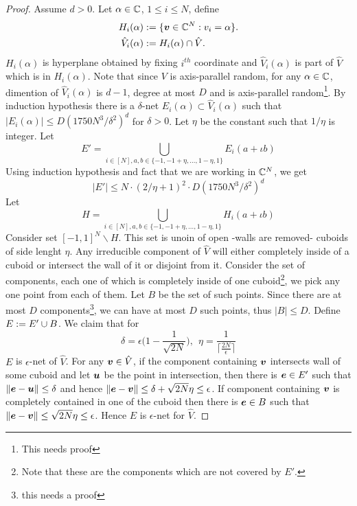 {\begin{proof}
Assume $d>0$. Let $\alpha \in \mathbb{C}$, $1\le i \le N$, define 
\begin{align*}
H_i(\alpha) &:= \{ \bm v \in \mathbb{C}^N : v_i = \alpha \}.\\
\hat V_i(\alpha) &:= H_i(\alpha) \cap \hat V.
\end{align*}
$H_i(\alpha)$ is hyperplane obtained by fixing $i^{th}$ coordinate and $\hat V_i(\alpha)$ is part of $\hat V$ which is in $H_i(\alpha)$. Note that since $V$ is axis-parallel random, for any $\alpha \in \mathbb{C}$, dimention of $\hat V_i(\alpha)$ is $d-1$, degree at most $D$ and is axis-parallel random\footnote{This needs proof}. By induction hypothesis there is a $\delta$-net $E_i(\alpha) \subset \hat V_i(\alpha)$ such that $|E_i(\alpha)|\le D(1750N^3/\delta^2)^d$ for $\delta>0$. Let $\eta$ be the constant such that $1/\eta$ is integer. Let
$$E'=\bigcup_{i\in [N],a,b \in \{-1,-1+\eta,...,1-\eta,1\}}E_i(a+\iota b)$$
Using induction hypothesis and fact that we are working in $\mathbb{C}^N$, we get
$$
|E'| \le N\cdot(2/\eta+1)^2\cdot D(1750N^3/\delta^2)^{d}
$$
Let
$$H=\bigcup_{i\in [N],a,b \in \{-1,-1+\eta,...,1-\eta,1\}}H_i(a+\iota b)$$
Consider set $[-1,1]^N\backslash H$. This set is unoin of open -walls are removed- cuboids of side lenght $\eta$. Any irreducible component of $\hat V$ will either completely inside of a cuboid or intersect the wall of it or disjoint from it. Consider the set of components, each one of which is completely inside of one cuboid\footnote{Note that these are the components which are not covered by $E'$.}, we pick any one point from each of them. Let $B$ be the set of such points. Since there are at most $D$ components\footnote{this needs a proof}, we can have at most $D$ such points, thus $|B| \le D$. Define $E:= E'\cup B$. We claim that for 
$$
\delta=\epsilon\Big(1-\frac{1}{\sqrt{2N}}\Big),\ \ \eta=\frac{1}{\lceil\frac{2N}{\epsilon}\rceil}
$$ 
$E$ is $\epsilon$-net of $\hat V$. For any $\bm v \in \hat V$, if the component containing $\bm v$ intersects wall of some cuboid and let $\bm u$ be the point in intersection, then there is $\bm e \in E'$ such that $\|\bm e-\bm u\|\le \delta$ and hence $\|\bm e-\bm v\| \le \delta + \sqrt{2N}\eta\le \epsilon$. If component containing $\bm v$ is completely contained in one of the cuboid then there is $\bm e \in B$ such that $\|\bm e-\bm v\|\le \sqrt{2N}\eta\le \epsilon$. Hence $E$ is $\epsilon$-net for $\hat V$.


\end{proof}}
